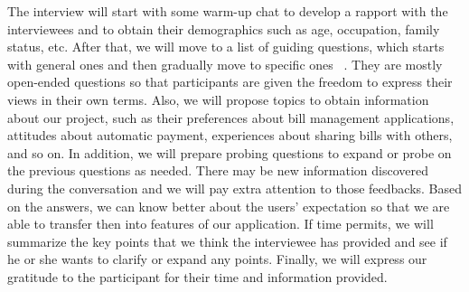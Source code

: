 \documentclass{sigchi}
\begin{document}
The interview will start with some warm-up chat to develop a rapport with the interviewees and to obtain their demographics such as age, occupation, family status, etc. After that, we will move to a list of guiding questions, which starts with general ones and then gradually move to specific ones ~\cite{GSSI}. They are mostly open-ended questions so that participants are given the freedom to express their views in their own terms. Also, we will propose topics to obtain information about our project, such as their preferences about bill management applications, attitudes about automatic payment, experiences about sharing bills with others, and so on. In addition, we will prepare probing questions to expand or probe on the previous questions as needed. There may be new information discovered during the conversation and we will pay extra attention to those feedbacks. Based on the answers, we can know better about the users' expectation so that we are able to transfer then into features of our application. If time permits, we will summarize the key points that we think the interviewee has provided and see if he or she wants to clarify or expand any points. Finally, we will express our gratitude to the participant for their time and information provided.
\end{document}
